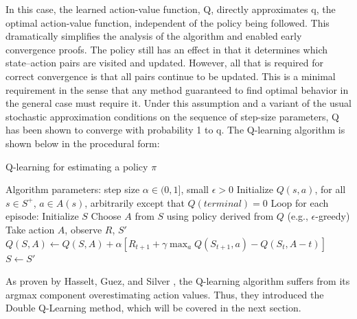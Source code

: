 \documentclass[12pt,a4paper]{article}
\begin{document}
In this case, the learned action-value function, Q, directly approximates q, the optimal
action-value function, independent of the policy being followed. This dramatically
simplifies the analysis of the algorithm and enabled early convergence proofs. The policy
still has an effect in that it determines which state–action pairs are visited and updated.
However, all that is required for correct convergence is that all pairs continue to be
updated. This is a minimal requirement in the sense that
any method guaranteed to find optimal behavior in the general case must require it.
Under this assumption and a variant of the usual stochastic approximation conditions on
the sequence of step-size parameters, Q has been shown to converge with probability 1 to
q. The Q-learning algorithm is shown below in the procedural form\cite{Sutton2015}:
\begin{algorithm}
    \caption{Q-learning for estimating a policy $\pi$}
    \begin{algorithmic}
    \State Algorithm parameters: step size $\alpha \in (0, 1]$, small  $\epsilon > 0$
    \State Initialize $Q(s,a)$, for all $s\in S^+$, $a\in A(s)$, arbitrarily except that $Q(terminal)=0$
    \State Loop for each episode:
        \State Initialize $S$
            \State Choose $A$ from $S$ using policy derived from $Q$ (e.g., $\epsilon$-greedy)
            \State Take action $A$, observe $R$, $S'$
            \State $Q(S, A) \leftarrow Q(S, A) + \alpha [R_{t+1}+\gamma \max_aQ(S_{t+1},a)-Q(S_t,A-t)]$
            \State $S \leftarrow S'$
        \EndFor
    \EndWhile
    \end{algorithmic}
\end{algorithm}

As proven by Hasselt, Guez, and Silver \cite{VanHasselt2015}, the Q-learning algorithm suffers from its argmax component overestimating action values. Thus, they introduced the Double Q-Learning method, which will be covered in the next section.
\end{document}
